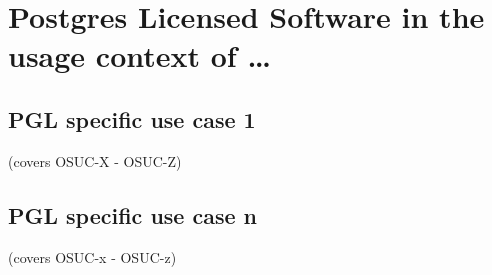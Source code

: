 %
%
%
%
%



\section{Postgres Licensed Software in the usage context of \ldots}

\label{OSUC-01-PGL} \label{OSUC-03-PGL} 
\label{OSUC-06-PGL} \label{OSUC-09-PGL}

\label{OSUC-02-PGL} \label{OSUC-04-PGL} \label{OSUC-05-PGL}
\label{OSUC-07-PGL} \label{OSUC-08-PGL} \label{OSUC-10-PGL}


\subsection{PGL specific use case 1}
(covers OSUC-X - OSUC-Z)

\subsection{PGL specific use case n}
(covers OSUC-x - OSUC-z)


%
